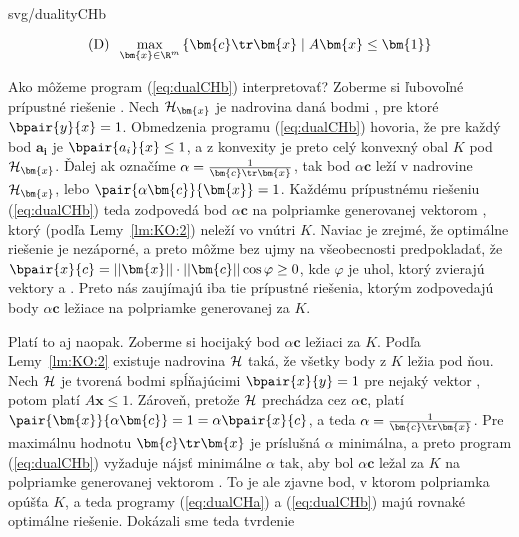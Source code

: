 \noindent
\begin{minipage}[t]{4cm}
  \vspace{0pt}
  \begin{myfig}{\textwidth}{svg/dualityCHb}
  \end{myfig}
\end{minipage}\hspace*{1cm}\begin{minipage}[t]{\textwidth-5cm}
  \vspace{0pt}

\begin{equation}
  \label{eq:dualCHb}
  \text{(D)}\;\;  \max_{\bm{x}\in\R^m}\left\{ \bm{c}\tr\bm{x} \mid A\bm{x}\le\bm{1}\right\}
\end{equation}

\noindent
Ako môžeme program (\ref{eq:dualCHb}) interpretovať? Zoberme si ľubovoľné prípustné riešenie . 
Nech ${\cal H}_{\bm{x}}$ je nadrovina daná bodmi , pre ktoré $\bpair{y}{x}=1$.
Obmedzenia programu (\ref{eq:dualCHb}) hovoria, že pre každý bod $\bm{a_i}$ je 
$\bpair{a_i}{x}\le1$, a z konvexity je preto celý konvexný obal $K$ pod ${\cal H}_{\bm{x}}$.
Ďalej ak označíme $\alpha=\frac{1}{\bm{c}\tr\bm{x}}$, tak  bod $\alpha\bm{c}$ leží v nadrovine 
${\cal H}_{\bm{x}}$, lebo $\pair{\alpha\bm{c}}{\bm{x}}=1$. Každému prípustnému riešeniu (\ref{eq:dualCHb})
teda zodpovedá bod $\alpha\bm{c}$ na polpriamke generovanej vektorom , ktorý (podľa Lemy~\ref{lm:KO:2})
neleží vo vnútri $K$.
Naviac je zrejmé, že optimálne riešenie je nezáporné, a preto môžme bez ujmy na všeobecnosti predpokladať,
že $\bpair{x}{c}=||\bm{x}||\cdot||\bm{c}||\cos\varphi\ge0$, kde $\varphi$ je uhol, ktorý zvierajú
vektory  a . Preto nás zaujímajú iba tie prípustné riešenia, ktorým zodpovedajú
body $\alpha\bm{c}$ ležiace na polpriamke generovanej  za $K$.
\end{minipage}

\vspace*{-4ex}
\noindent
{}
Platí to aj naopak. Zoberme si hocijaký bod $\alpha\bm{c}$ ležiaci za $K$. Podľa Lemy~\ref{lm:KO:2}
existuje nadrovina $\cal H$ taká, že všetky body z $K$ ležia pod ňou. Nech $\cal H$ je tvorená
bodmi  spĺňajúcimi $\bpair{x}{y}=1$ pre nejaký vektor , potom platí $A\bm{x}\le1$.
Zároveň, pretože $\cal H$ prechádza cez $\alpha\bm{c}$, platí 
$\pair{\bm{x}}{\alpha\bm{c}}=1=\alpha\bpair{x}{c}$, a teda $\alpha=\frac{1}{\bm{c}\tr\bm{x}}$.
Pre maximálnu hodnotu $\bm{c}\tr\bm{x}$ je príslušná $\alpha$ minimálna, a preto program (\ref{eq:dualCHb})
vyžaduje nájsť minimálne $\alpha$ tak, aby bol $\alpha\bm{c}$ ležal za $K$ na polpriamke generovanej 
vektorom . To je ale zjavne bod, v ktorom polpriamka opúšťa $K$, a teda programy
(\ref{eq:dualCHa}) a (\ref{eq:dualCHb}) majú rovnaké optimálne riešenie.
Dokázali sme teda tvrdenie

